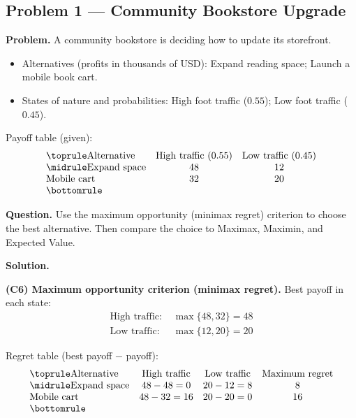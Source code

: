 	\hypertarget{c6-ex1}{}
	\subsection*{Problem 1 — Community Bookstore Upgrade}
	
	\textbf{Problem.} A community bookstore is deciding how to update its storefront.
	
	\begin{itemize}
		\item Alternatives (profits in thousands of USD): Expand reading space; Launch a mobile book cart.
		\item States of nature and probabilities: High foot traffic ($0.55$); Low foot traffic ($0.45$).
	\end{itemize}
	
	Payoff table (given):
	\[
	\begin{array}{lcc}
		\toprule
		\text{Alternative} & \text{High traffic }(0.55) & \text{Low traffic }(0.45)\\
		\midrule
		\text{Expand space} & 48 & 12\\
		\text{Mobile cart} & 32 & 20\\
		\bottomrule
	\end{array}
	\]
	
	\textbf{Question.} Use the maximum opportunity (minimax regret) criterion to choose the best alternative. Then compare the choice to Maximax, Maximin, and Expected Value.
	
	\textbf{Solution.}
	
	\textbf{(C6) Maximum opportunity criterion (minimax regret).} Best payoff in each state:
	\[
	\begin{aligned}
		\text{High traffic: } &\max\{48, 32\} = 48\\
		\text{Low traffic: }  &\max\{12, 20\} = 20
	\end{aligned}
	\]
	
	Regret table (best payoff $-$ payoff):
	\[
	\begin{array}{lccc}
		\toprule
		\text{Alternative} & \text{High traffic} & \text{Low traffic} & \text{Maximum regret}\\
		\midrule
		\text{Expand space} & 48-48=0 & 20-12=8 & 8\\
		\text{Mobile cart}  & 48-32=16 & 20-20=0 & 16\\
		\bottomrule
	\end{array}
	\]
	
